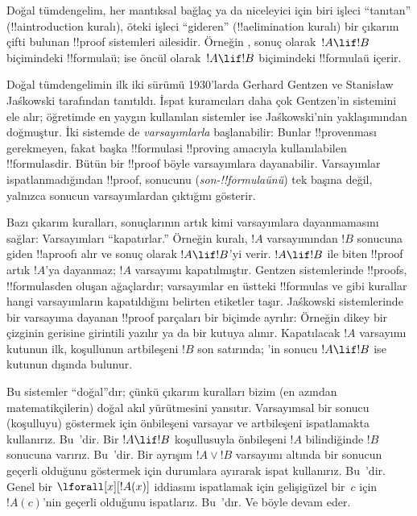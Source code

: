 



Doğal tümdengelim, her mantıksal bağlaç ya da niceleyici için biri işleci
``tanıtan'' (!!a{introduction} kuralı), öteki işleci ``gideren''
(!!a{elimination} kuralı) bir çıkarım çifti bulunan !!{proof} sistemleri
ailesidir. Örneğin \Intro{\lif}, sonuç olarak~$!A \lif !B$ biçimindeki
!!{formula}{}ü; \Elim{\lif} ise öncül olarak~$!A \lif !B$ biçimindeki
!!{formula}{}ü içerir.

Doğal tümdengelimin ilk iki sürümü 1930'larda Gerhard Gentzen ve Stanisław
Jaśkowski tarafından tanıtıldı. İspat kuramcıları daha çok Gentzen'in
sistemini ele alır; öğretimde en yaygın kullanılan sistemler ise
Jaśkowski'nin yaklaşımından doğmuştur. İki sistemde de \emph{varsayımlarla}
başlanabilir: Bunlar !!{prove}{}nması gerekmeyen, fakat başka !!{formula}s{}i
!!{proving} amacıyla kullanılabilen !!{formula}s{}dir. Bütün bir !!{proof} böyle
varsayımlara dayanabilir. Varsayımlar ispatlanmadığından !!{proof}, sonucunu
(\emph{son-!!{formula}{}ünü}) tek başına değil, yalnızca sonucun varsayımlardan
çıktığını gösterir.

Bazı çıkarım kuralları, sonuçlarının artık kimi varsayımlara dayanmamasını
sağlar: Varsayımları ``kapatırlar.'' Örneğin \Intro{\lif} kuralı, $!A$
varsayımından $!B$ sonucuna giden !!a{proof}{}ı alır ve sonuç olarak
$!A \lif !B$'yi verir. $!A \lif !B$ ile biten !!{proof} artık $!A$'ya
dayanmaz; $!A$ varsayımı kapatılmıştır. Gentzen sistemlerinde !!{proof}s,
!!{formula}s{}den oluşan ağaçlardır; varsayımlar en üstteki !!{formula}s ve
\Intro{\lif} gibi kurallar hangi varsayımların kapatıldığını belirten
etiketler taşır. Jaśkowski sistemlerinde bir varsayıma dayanan !!{proof}
parçaları bir biçimde ayrılır: Örneğin dikey bir çizginin gerisine girintili
yazılır ya da bir kutuya alınır. Kapatılacak $!A$ varsayımı kutunun ilk,
koşullunun artbileşeni $!B$ son satırında; \Intro{\lif}'in sonucu
$!A \lif !B$ ise kutunun dışında bulunur.

Bu sistemler ``doğal''dır; çünkü çıkarım kuralları bizim (en azından
matematikçilerin) doğal akıl yürütmesini yansıtır. Varsayımsal bir sonucu
(koşulluyu) göstermek için önbileşeni varsayar ve artbileşeni ispatlamakta
kullanırız. Bu~\Intro{\lif}'dir. Bir $!A \lif !B$ koşullusuyla önbileşeni
$!A$ bilindiğinde $!B$ sonucuna varırız. Bu~\Elim{\lif}'dir. Bir ayrışım
$!A \lor !B$ varsayımı altında bir sonucun geçerli olduğunu göstermek için
durumlara ayırarak ispat kullanırız. Bu~\Elim{\lor}'dir. Genel bir
$\lforall[x][!A(x)]$ iddiasını ispatlamak için gelişigüzel bir~$c$ için
$!A(c)$'nin geçerli olduğunu ispatlarız. Bu~\Intro{\lforall}'dır. Ve böyle
devam eder.

